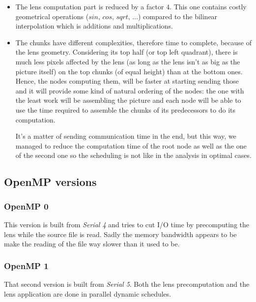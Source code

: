 \documentclass[10pt,a4paper]{article}
\begin{document}
\begin{itemize}
    \item The lens computation part is reduced by a factor $4$. This one
    contains costly geometrical operations ($sin$, $cos$, $sqrt$, $\ldots$)
    compared to the bilinear interpolation which is additions and
    multiplications.

    \item The chunks have different complexities, therefore time to complete,
    because of the lens geometry. Considering its top half (or top left
    quadrant), there is much less pixels affected by the lens (as long as the
    lens isn't as big as the picture itself) on the top chunks (of equal
    height) than at the bottom ones. Hence, the nodes computing them, will be
    faster at starting sending those and it will provide some kind of natural
    ordering of the nodes: the one with the least work will be assembling the
    picture and each node will be able to use the time required to assemble
    the chunks of its predecessors to do its computation.

    It's a matter of sending communication time in the end, but this way, we
    managed to reduce the computation time of the root node as well as the
    one of the second one so the scheduling is not like in the analysis in
    optimal cases.
\end{itemize}

\subsection{OpenMP versions}

\subsubsection{OpenMP 0}

This version is built from \emph{Serial 4} and tries to cut I/O time by
precomputing the lens while the source file is read. Sadly the memory bandwidth
appears to be make the reading of the file way slower than it used to be.

\subsubsection{OpenMP 1}

That second version is built from \emph{Serial 5}. Both the lens precomputation
and the lens application are done in parallel dynamic schedules.
\end{document}
